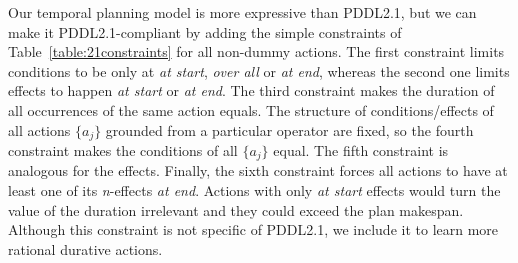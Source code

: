 \documentclass{ecai}
\begin{document}
Our temporal planning model is more expressive than PDDL2.1, but we can make it PDDL2.1-compliant by adding the simple constraints of Table~\ref{table:21constraints} for all non-dummy actions.
The first constraint limits conditions to be only at \emph{at start}, \emph{over all} or \emph{at end}, whereas the second one limits effects to happen \emph{at start} or \emph{at end}.
The third constraint makes the duration of all occurrences of the same action equals.
The structure of conditions/effects of all actions $\{a_j\}$ grounded from a particular operator are fixed, so the fourth constraint makes the conditions of all $\{a_j\}$ equal. The fifth constraint is analogous for the effects.
Finally, the sixth constraint forces all actions to have at least one of its \textit{n}-effects \textit{at end}. Actions with only \textit{at start} effects would turn the value of the duration irrelevant and they could exceed the plan makespan. Although this constraint is not specific of PDDL2.1, we include it to learn more rational durative actions.
\end{document}
